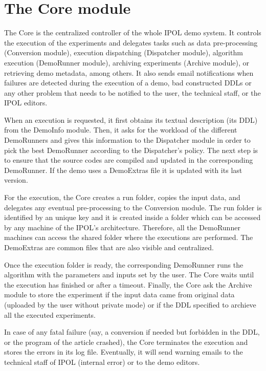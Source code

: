 \section{The Core module}
The Core is the centralized controller of the whole IPOL demo system. It controls the execution of the experiments and delegates tasks such as data pre-processing (Conversion module), execution dispatching (Dispatcher module), algorithm execution (DemoRunner module), archiving experiments (Archive module), or retrieving demo metadata, among others. It also sends email notifications when failures are detected during the execution of a demo, bad constructed DDLs or any other problem that needs to be notified to the user, the technical staff, or the IPOL editors.

When an execution is requested, it first obtains its textual description (its DDL) from the DemoInfo module. Then, it asks for the workload of the different DemoRunners and gives this information to the Dispatcher module in order to pick the best DemoRunner according to the Dispatcher's policy. The next step is to ensure that the source codes are compiled and updated in the corresponding DemoRunner. If the demo uses a DemoExtras file it is updated with its last version.

For the execution, the Core creates a run folder, copies the input data, and delegates any eventual pre-processing to the Conversion module. The run folder is identified by an unique key and it is created inside a folder which can be accessed by any machine of the IPOL's architecture. Therefore, all the DemoRunner machines can access the shared folder where the executions are performed. The DemoExtras are common files that are also visible and centralized.

Once the execution folder is ready, the corresponding DemoRunner runs the algorithm with the parameters and inputs set by the user. The Core waits until the execution has finished or after a timeout. Finally, the Core ask the Archive module to store the experiment if the input data came from original data (uploaded by the user without private mode) or if the DDL specified to archieve all the executed experiments.

In case of any fatal failure (say, a conversion if needed but forbidden in the DDL, or the program of the article crashed), the Core terminates the execution and stores the errors in its log file. Eventually, it will send warning emails to the technical staff of IPOL (internal error) or to the demo editors.

